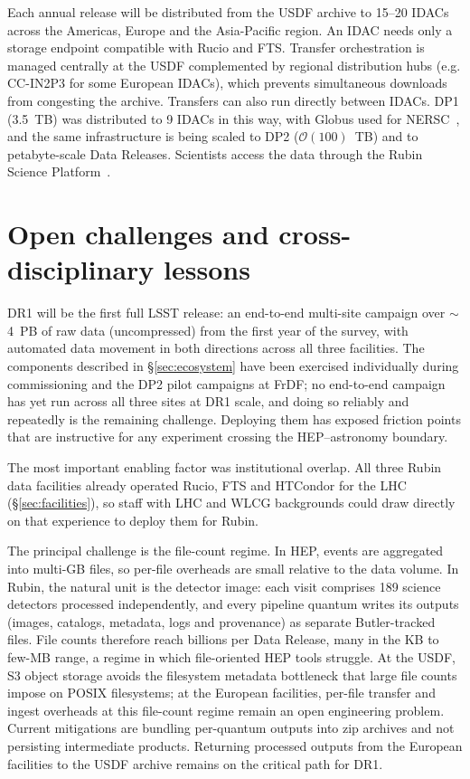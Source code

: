 Each annual release will be distributed from the USDF archive to 15--20 IDACs~\cite{2024EPJWC.29507017M} across the Americas, Europe and the Asia-Pacific region.
An IDAC needs only a storage endpoint compatible with Rucio and FTS.
Transfer orchestration is managed centrally at the USDF complemented by regional distribution hubs (e.g. CC-IN2P3 for some European IDACs), which prevents simultaneous downloads from congesting the archive.
Transfers can also run directly between IDACs.
DP1 (3.5~TB) was distributed to 9 IDACs in this way, with Globus used for NERSC~\cite{2026AJ....171..360V,RTN-086}, and the same infrastructure is being scaled to DP2 ($\mathcal{O}(100)$~TB) and to petabyte-scale Data Releases.
Scientists access the data through the Rubin Science Platform~\cite{2024SPIE13101E..2BO}.

\section{Open challenges and cross-disciplinary lessons}
\label{sec:challenges}

DR1 will be the first full LSST release: an end-to-end multi-site campaign over $\sim$4~PB of raw data (uncompressed) from the first year of the survey, with automated data movement in both directions across all three facilities.
The components described in \S\ref{sec:ecosystem} have been exercised individually during commissioning and the DP2 pilot campaigns at FrDF; no end-to-end campaign has yet run across all three sites at DR1 scale, and doing so reliably and repeatedly is the remaining challenge.
Deploying them has exposed friction points that are instructive for any experiment crossing the HEP--astronomy boundary.

The most important enabling factor was institutional overlap.
All three Rubin data facilities already operated Rucio, FTS and HTCondor for the LHC (\S\ref{sec:facilities}), so staff with LHC and WLCG backgrounds could draw directly on that experience to deploy them for Rubin.

The principal challenge is the file-count regime.
In HEP, events are aggregated into multi-GB files, so per-file overheads are small relative to the data volume.
In Rubin, the natural unit is the detector image: each visit comprises 189 science detectors processed independently, and every pipeline quantum writes its outputs (images, catalogs, metadata, logs and provenance) as separate Butler-tracked files.
File counts therefore reach billions per Data Release, many in the KB to few-MB range, a regime in which file-oriented HEP tools struggle.
At the USDF, S3 object storage avoids the filesystem metadata bottleneck that large file counts impose on POSIX filesystems; at the European facilities, per-file transfer and ingest overheads at this file-count regime remain an open engineering problem.
Current mitigations are bundling per-quantum outputs into zip archives and not persisting intermediate products.
Returning processed outputs from the European facilities to the USDF archive remains on the critical path for DR1.

